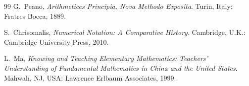 \documentclass[11pt,a4paper]{article}
\theoremstyle{definition}
\begin{document}
\begin{thebibliography}{99}
 G.~Peano, \emph{Arithmetices Principia, Nova Methodo Exposita}. Turin, Italy: Fratres Bocca, 1889.
 
 S.~Chrisomalis, \emph{Numerical Notation: A Comparative History}. Cambridge, U.K.: Cambridge University Press, 2010.
 
 L.~Ma, \emph{Knowing and Teaching Elementary Mathematics: Teachers' Understanding of Fundamental Mathematics in China and the United States}. Mahwah, NJ, USA: Lawrence Erlbaum Associates, 1999.
 
\end{thebibliography}
 
\end{document}
